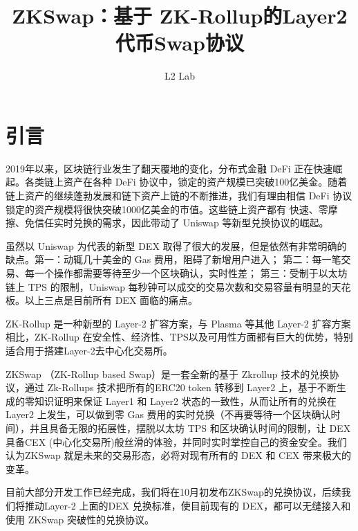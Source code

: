 \documentclass[]{template/llncs}
\begin{document}


%
\title{ZKSwap：基于 ZK-Rollup的Layer2 代币Swap协议}

\author{L2 Lab}


\maketitle

%
\section{引言}

2019年以来，区块链行业发生了翻天覆地的变化，分布式金融 DeFi 正在快速崛起。各类链上资产在各种 DeFi 协议中，锁定的资产规模已突破100亿美金。随着链上资产的继续蓬勃发展和链下资产上链的不断推进，我们有理由相信 DeFi 协议锁定的资产规模将很快突破1000亿美金的市值。这些链上资产都有 快速、零摩擦、免信任实时兑换的需求，因此带动了 Uniswap \cite{uniswapofficial} 等新型兑换协议的崛起。

虽然以 Uniswap 为代表的新型 DEX 取得了很大的发展，但是依然有非常明确的缺点。第一：动辄几十美金的 Gas 费用，阻碍了新增用户进入；  第二：每一笔交易、每一个操作都需要等待至少一个区块确认，实时性差； 第三：受制于以太坊链上 TPS 的限制，Uniswap 每秒钟可以成交的交易次数和交易容量有明显的天花板。以上三点是目前所有 DEX 面临的痛点。

ZK-Rollup \cite{zkrollups} 是一种新型的 Layer-2 扩容方案，与 Plasma 等其他 Layer-2 扩容方案相比，ZK-Rollup 在安全性、经济性、TPS以及可用性方面都有巨大的优势，特别适合用于搭建Layer-2去中心化交易所。

ZKSwap （ZK-Rollup based Swap）是一套全新的基于 Zkrollup 技术的兑换协议，通过 Zk-Rollups 技术把所有的ERC20 token 转移到 Layer2 上，基于不断生成的零知识证明来保证 Layer1 和 Layer2 状态的一致性，从而让所有的兑换在 Layer2 上发生，可以做到零 Gas 费用的实时兑换（不再要等待一个区块确认时间），并且具备无限的拓展性，摆脱以太坊 TPS 和区块确认时间的限制，让 DEX 具备CEX (中心化交易所)般丝滑的体验，并同时实时掌控自己的资金安全。我们认为ZKSwap 就是未来的交易形态，必将对现有所有的 DEX 和 CEX 带来极大的变革。

目前大部分开发工作已经完成，我们将在10月初发布ZKSwap的兑换协议，后续我们将推动Layer-2 上面的DEX 兑换标准，使目前现有的 DEX，都可以无缝接入和使用 ZKSwap 突破性的兑换协议。
\end{document}
